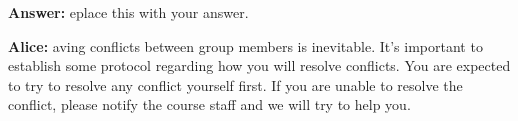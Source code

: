 \documentclass[12pt]{article}
\newenvironment{answer}[1]{
\color{blue}
	{\bf Answer:}
}{
}
\newenvironment{alice}[1]{
\color{magenta}
	{\bf Alice:}
}{
}
\begin{document}
\begin{itemize}
\begin{answer}

Replace this with your answer.
\end{answer}

\begin{alice}

Having conflicts between group members is inevitable.  It's important to establish some protocol regarding how you will resolve conflicts.  You are expected to try to resolve any conflict yourself first.  If you are unable to resolve the conflict, please notify the course staff and we will try to help you.

\end{alice}

\end{itemize}
\end{document}
